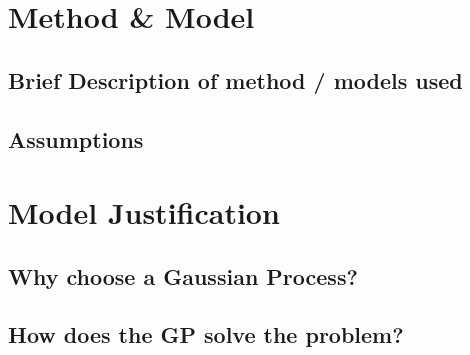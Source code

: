 \documentclass{article}                                                   %
\begin{document}
\section{Method \& Model}
  \subsection{Brief Description of method / models used}
  \subsection{Assumptions}
\section{Model Justification}
  \subsection{Why choose a Gaussian Process?}
  \subsection{How does the GP solve the problem?}
\end{document}
